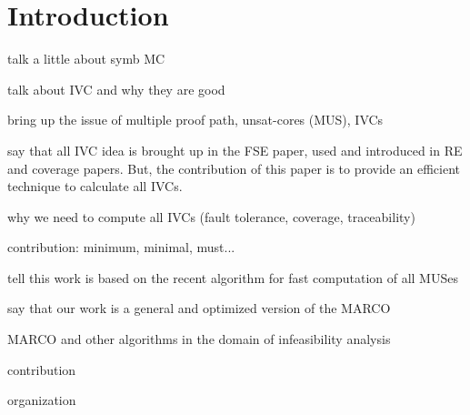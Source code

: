 \section{Introduction}
\label{sec:intro}

talk a little about symb MC

talk about IVC and why they are good

bring up the issue of multiple proof path, unsat-cores (MUS), IVCs

say that all IVC idea is brought up in the FSE paper, used and introduced in RE and coverage papers. But, the contribution of this paper is to provide an efficient technique to calculate all IVCs.

why we need to compute all IVCs (fault tolerance, coverage, traceability)

contribution: minimum, minimal, must...

tell this work is based on the recent algorithm for fast computation of all MUSes

say that our work is a general and optimized version of the MARCO

MARCO and other algorithms in the domain of infeasibility analysis

contribution

organization


